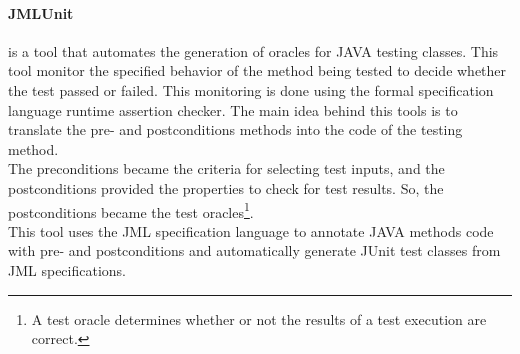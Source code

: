 \documentclass[citeauthoryear]{llncs}
\begin{document}
\paragraph{\textbf{JMLUnit}\cite{Cheon04thejml}} is a tool that automates the generation of oracles for JAVA testing classes. This tool
monitor the specified behavior of the method being tested to decide whether the test passed or failed.
This monitoring is done using the formal specification language runtime assertion checker.
The main idea behind this tools is to translate the pre- and postconditions methods into the code of the testing method.\\
The preconditions became the criteria for selecting test inputs, and the postconditions provided the properties to check for
test results. So, the postconditions became the test oracles\footnote{A test oracle determines whether or not the results of a test
execution are correct\cite{Peters95generatinga}.}.\\
This tool uses the JML\cite{Burdy03anoverview} specification language to annotate JAVA methods code with pre- and postconditions and
automatically generate JUnit test classes from JML specifications.

\end{document}
